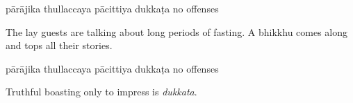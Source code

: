 \begin{exam}{\autoExamName}
\begin{problem*}
\begin{parts}
  \bigskip

  \begin{answers}{5}
    \bChoices
     pārājika\eAns
     thullaccaya\eAns
     pācittiya\eAns
     dukkaṭa\eAns
     no offenses\eAns
    \eChoices
  \end{answers}

  \bigskip

\item The lay guests are talking about long periods of fasting. A bhikkhu comes
  along and tops all their stories.

  \bigskip

  \begin{answers}{5}
    \bChoices
     pārājika\eAns
     thullaccaya\eAns
     pācittiya\eAns
     dukkaṭa\eAns
     no offenses\eAns
    \eChoices
  \end{answers}

  \begin{solution}
    Truthful boasting only to impress is \emph{dukkata}.
  \end{solution}

\end{parts}

\end{problem*}

\end{exam}

